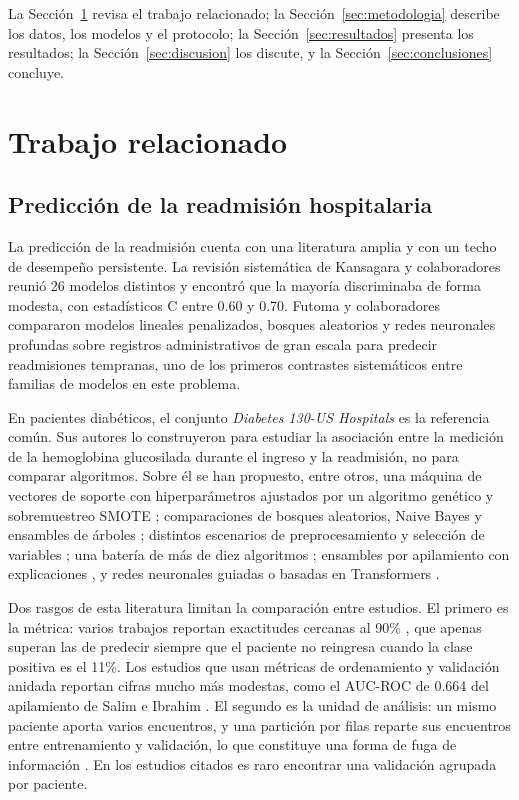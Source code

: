 \documentclass[pdflatex,sn-mathphys-num]{sn-jnl}
\theoremstyle{plain}
\begin{document}
La Sección~\ref{sec:relacionado} revisa el trabajo relacionado; la Sección~\ref{sec:metodologia} describe los datos, los modelos y el protocolo; la Sección~\ref{sec:resultados} presenta los resultados; la Sección~\ref{sec:discusion} los discute, y la Sección~\ref{sec:conclusiones} concluye.

\section{Trabajo relacionado}\label{sec:relacionado}

\subsection{Predicción de la readmisión hospitalaria}\label{subsec:rel_readmision}

La predicción de la readmisión cuenta con una literatura amplia y con un techo de desempeño persistente. La revisión sistemática de Kansagara y colaboradores \cite{bib_kansagara} reunió 26 modelos distintos y encontró que la mayoría discriminaba de forma modesta, con estadísticos C entre 0.60 y 0.70. Futoma y colaboradores \cite{bib_futoma} compararon modelos lineales penalizados, bosques aleatorios y redes neuronales profundas sobre registros administrativos de gran escala para predecir readmisiones tempranas, uno de los primeros contrastes sistemáticos entre familias de modelos en este problema.

En pacientes diabéticos, el conjunto \emph{Diabetes 130-US Hospitals} \cite{bib_strack} es la referencia común. Sus autores lo construyeron para estudiar la asociación entre la medición de la hemoglobina glucosilada durante el ingreso y la readmisión, no para comparar algoritmos. Sobre él se han propuesto, entre otros, una máquina de vectores de soporte con hiperparámetros ajustados por un algoritmo genético y sobremuestreo SMOTE \cite{bib_cui_2018}; comparaciones de bosques aleatorios, Naive Bayes y ensambles de árboles \cite{bib_shang_2021}; distintos escenarios de preprocesamiento y selección de variables \cite{bib_neto_2021}; una batería de más de diez algoritmos \cite{bib_liu_2024}; ensambles por apilamiento con explicaciones \cite{bib_lu_2022, bib_salim_2026}, y redes neuronales guiadas o basadas en Transformers \cite{bib_ram_2023, bib_garcia_mosquera_2025}.

Dos rasgos de esta literatura limitan la comparación entre estudios. El primero es la métrica: varios trabajos reportan exactitudes cercanas al 90\% \cite{bib_neto_2021}, que apenas superan las de predecir siempre que el paciente no reingresa cuando la clase positiva es el 11\%. Los estudios que usan métricas de ordenamiento y validación anidada reportan cifras mucho más modestas, como el AUC-ROC de 0.664 del apilamiento de Salim e Ibrahim \cite{bib_salim_2026}. El segundo es la unidad de análisis: un mismo paciente aporta varios encuentros, y una partición por filas reparte sus encuentros entre entrenamiento y validación, lo que constituye una forma de fuga de información \cite{bib_kapoor_2023}. En los estudios citados es raro encontrar una validación agrupada por paciente.
\end{document}
